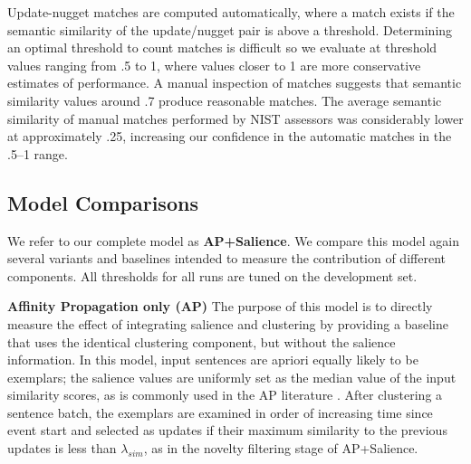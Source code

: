 Update-nugget matches are computed automatically, where a
match exists if the semantic similarity of the update/nugget pair is above 
a threshold.
Determining an optimal threshold to count matches is difficult so 
we evaluate at 
threshold values ranging
from .5 to 1, where values closer to 1 are more conservative estimates of
performance.
A manual inspection of matches 
suggests that semantic similarity values around .7 produce reasonable matches.
The average semantic similarity of manual matches performed 
by NIST assessors was considerably lower at approximately .25, increasing
our confidence in the automatic matches in the .5--1 range.


\subsection{Model Comparisons}
We refer to our complete model as \textbf{AP+Salience}.  We compare this model again several variants and baselines intended to measure the contribution of different components. All thresholds
for all runs are tuned on the development set.

\textbf{Affinity Propagation only (AP) } The purpose of this model
is to directly measure the effect of integrating salience and clustering by providing a baseline that uses the identical 
clustering component, but without the salience information.
In this model, input sentences are apriori equally likely to be exemplars;
the salience values are uniformly set as the median value of the 
input similarity scores, as is commonly used in the AP literature \cite{frey2007clustering}.
After clustering a sentence batch, the exemplars are examined in order
of increasing time since event start and selected as updates if their
maximum similarity to the previous updates is less than $\lambda_{sim}$,
as in the novelty filtering stage of AP+Salience.

